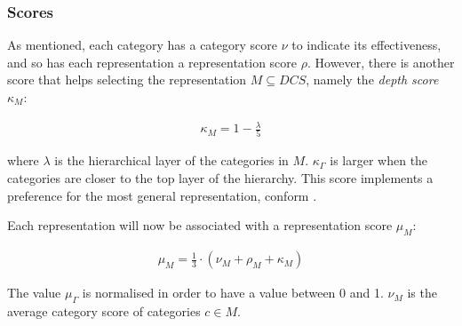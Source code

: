 \subsubsection{Scores}

As mentioned, each category has a category score $\nu$ to indicate its effectiveness, and so has each representation a representation score $\rho$. However, there is another score that helps selecting the representation $M\subseteq DCS$, namely the {\em depth score} $\kappa_M$:

\begin{eqnarray}
\displaystyle
\kappa_M=1 - \frac{\lambda}{5}
\end{eqnarray}

\noindent
where $\lambda$ is the hierarchical layer of the categories in $M$. $\kappa_{\Gamma}$ is larger when the categories are closer to the top layer of the hierarchy. This score implements a preference for the most general representation, conform \cite{steels:1996b}. 

Each representation will now be associated with a representation score $\mu_M$:

\begin{eqnarray}
\displaystyle
\mu_M=\frac{1}{3}\cdot (\nu_M+\rho_M+\kappa_M)
\end{eqnarray}

\noindent
The value $\mu_{\Gamma}$ is normalised in order to have a value between 0 and 1. $\nu_M$ is the average category score of categories $c\in M$.
